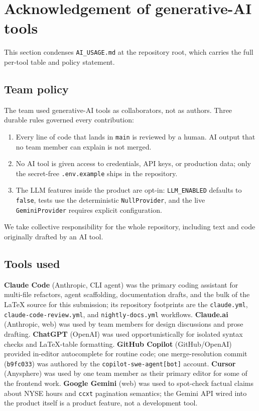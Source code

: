 \section{Acknowledgement of generative-AI tools}
\label{sec:ai}

This section condenses \texttt{AI\_USAGE.md} at the repository root, which
carries the full per-tool table and policy statement.

\subsection*{Team policy}

The team used generative-AI tools as collaborators, not as authors. Three
durable rules governed every contribution:

\begin{enumerate}
  \item Every line of code that lands in \texttt{main} is reviewed by a human. AI
        output that no team member can explain is not merged.
  \item No AI tool is given access to credentials, API keys, or production data;
        only the secret-free \texttt{.env.example} ships in the repository.
  \item The LLM features inside the product are opt-in: \texttt{LLM\_ENABLED}
        defaults to \texttt{false}, tests use the deterministic
        \texttt{NullProvider}, and the live \texttt{GeminiProvider} requires
        explicit configuration.
\end{enumerate}

We take collective responsibility for the whole repository, including text and
code originally drafted by an AI tool.

\subsection*{Tools used}

\textbf{Claude Code} (Anthropic, CLI agent) was the primary coding assistant for
multi-file refactors, agent scaffolding, documentation drafts, and the bulk of the
LaTeX source for this submission; its repository footprints are the
\texttt{claude.yml}, \texttt{claude-code-review.yml}, and \texttt{nightly-docs.yml}
workflows. \textbf{Claude.ai} (Anthropic, web) was used by team members for design
discussions and prose drafting. \textbf{ChatGPT} (OpenAI) was used opportunistically
for isolated syntax checks and LaTeX-table formatting. \textbf{GitHub Copilot}
(GitHub/OpenAI) provided in-editor autocomplete for routine code; one merge-resolution
commit (\texttt{b9fc033}) was authored by the \texttt{copilot-swe-agent[bot]} account.
\textbf{Cursor} (Anysphere) was used
by one team member as their primary editor for some of the frontend work.
\textbf{Google Gemini} (web) was used to spot-check factual claims about NYSE hours
and \texttt{ccxt} pagination semantics; the Gemini API wired into the product
itself is a product feature, not a development tool.

